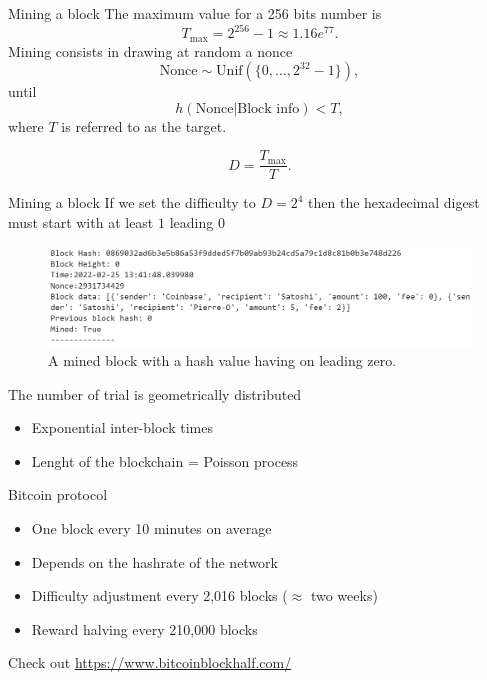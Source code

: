 \documentclass{beamer}
\begin{document}
\begin{frame}{Mining a block}
The maximum value for a 256 bits number is
$$
T_\text{max} = 2^{256}-1 \approx 1.16e^{77}.
$$
Mining consists in drawing at random a nonce 
$$
\text{Nonce} \sim \text{Unif}(\{0,\ldots, 2^{32}-1\}),
$$
until 
$$
h(\text{Nonce}|\text{Block info})<T,
$$
where $T$ is referred to as the target.
\begin{tcolorbox}[enhanced,drop shadow, title=Difficulty of the cryptopuzzle]
$$
D = \frac{T_{\max}}{T}.
$$
\end{tcolorbox}

\end{frame}
\begin{frame}{Mining a block}
If we set the difficulty to $D = 2^4$ then the hexadecimal digest must start with at least $1$ leading $0$
\begin{figure}[!ht]
    \includegraphics[width = \textwidth]{../../Figures/block_mined.png}
    \captionsetup{width=0.8\textwidth}
    \centering
    \caption{A mined block with a hash value having on leading zero.}
    \label{fig:block_mined}
\end{figure}
The number of trial is geometrically distributed
\begin{itemize}
\item Exponential inter-block times
\item Lenght of the blockchain = Poisson process
\end{itemize}
\end{frame}
\begin{frame}{Bitcoin protocol}
\begin{itemize}
  \item One block every 10 minutes on average
  \item Depends on the hashrate of the network
  \item Difficulty adjustment every 2,016 blocks ($\approx$ two weeks)
  \item Reward halving every 210,000 blocks
\end{itemize}
Check out \url{https://www.bitcoinblockhalf.com/}

\end{frame}
\end{document}
